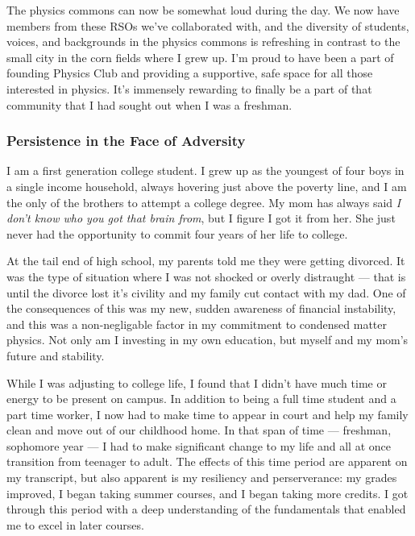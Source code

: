 \documentclass[11pt]{article}
\begin{document}
The physics commons can now be somewhat loud during the day. We now have members from these RSOs we've collaborated with, and the diversity of students, voices, and backgrounds in the physics commons is refreshing in contrast to the small city in the corn fields where I grew up. I'm proud to have been a part of founding Physics Club and providing a supportive, safe space for all those interested in physics. It's immensely rewarding to finally be a part of that community that I had sought out when I was a freshman.
\subsubsection*{Persistence in the Face of Adversity}
I am a first generation college student. I grew up as the youngest of four boys in a single income household, always hovering just above the poverty line, and I am the only of the brothers to attempt a college degree. My mom has always said \textit{I don't know who you got that brain from}, but I figure I got it from her. She just never had the opportunity to commit four years of her life to college.

At the tail end of high school, my parents told me they were getting divorced. It was the type of situation where I was not shocked or overly distraught --- that is until the divorce lost it's civility and my family cut contact with my dad. One of the consequences of this was my new, sudden awareness of financial instability, and this was a non-negligable factor in my commitment to condensed matter physics. Not only am I investing in my own education, but myself and my mom's future and stability.

While I was adjusting to college life, I found that I didn't have much time or energy to be present on campus. In addition to being a full time student and a part time worker, I now had to make time to appear in court and help my family clean and move out of our childhood home. In that span of time --- freshman, sophomore year --- I had to make significant change to my life and all at once transition from teenager to adult. The effects of this time period are apparent on my transcript, but also apparent is my resiliency and perserverance: my grades improved, I began taking summer courses, and I began taking more credits. I got through this period with a deep understanding of the fundamentals that enabled me to excel in later courses.
\end{document}
